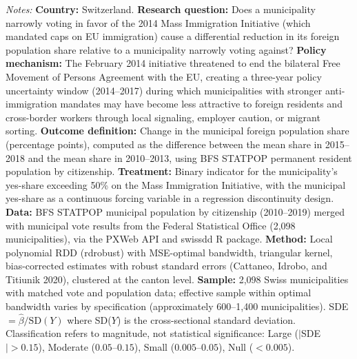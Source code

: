 \begin{table}[t]
\begin{tablenotes}[flushleft]
\item \textit{Notes:} \textbf{Country:} Switzerland. \textbf{Research question:} Does a municipality narrowly voting in favor of the 2014 Mass Immigration Initiative (which mandated caps on EU immigration) cause a differential reduction in its foreign population share relative to a municipality narrowly voting against? \textbf{Policy mechanism:} The February 2014 initiative threatened to end the bilateral Free Movement of Persons Agreement with the EU, creating a three-year policy uncertainty window (2014--2017) during which municipalities with stronger anti-immigration mandates may have become less attractive to foreign residents and cross-border workers through local signaling, employer caution, or migrant sorting. \textbf{Outcome definition:} Change in the municipal foreign population share (percentage points), computed as the difference between the mean share in 2015--2018 and the mean share in 2010--2013, using BFS STATPOP permanent resident population by citizenship. \textbf{Treatment:} Binary indicator for the municipality's yes-share exceeding 50\% on the Mass Immigration Initiative, with the municipal yes-share as a continuous forcing variable in a regression discontinuity design. \textbf{Data:} BFS STATPOP municipal population by citizenship (2010--2019) merged with municipal vote results from the Federal Statistical Office (2,098 municipalities), via the PXWeb API and swissdd R package. \textbf{Method:} Local polynomial RDD (rdrobust) with MSE-optimal bandwidth, triangular kernel, bias-corrected estimates with robust standard errors (Cattaneo, Idrobo, and Titiunik 2020), clustered at the canton level. \textbf{Sample:} 2,098 Swiss municipalities with matched vote and population data; effective sample within optimal bandwidth varies by specification (approximately 600--1,400 municipalities). SDE $= \hat{\beta} / \text{SD}(Y)$ where SD($Y$) is the cross-sectional standard deviation. Classification refers to magnitude, not statistical significance: Large ($|$SDE$| > 0.15$), Moderate ($0.05$--$0.15$), Small ($0.005$--$0.05$), Null ($< 0.005$).
\end{tablenotes}
\end{table}

